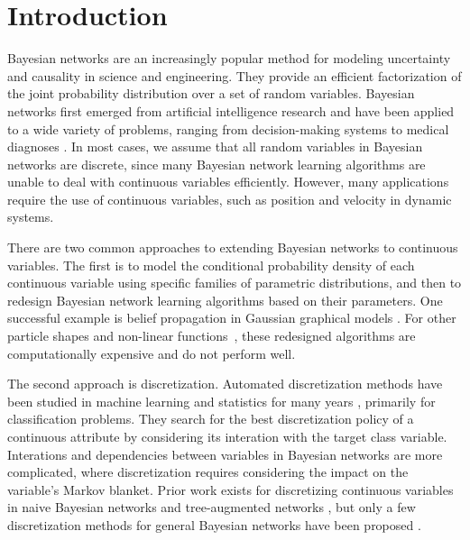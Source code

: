 \section{Introduction}
\label{intro}
Bayesian networks \citep{Pearl_1988, PGM_2009} are an increasingly popular method for modeling uncertainty and causality in science and engineering. They provide an efficient factorization of the joint probability distribution over a set of random variables. Bayesian networks first emerged from artificial intelligence research and have been applied to a wide variety of problems, ranging from decision-making systems \citep{DMU_2015} to medical diagnoses \citep{Lustgarten_2011}. In most cases, we assume that all random variables in Bayesian networks are discrete, since many Bayesian network learning algorithms are unable to deal with continuous variables efficiently. However, many applications
require the use of continuous variables, such as position and velocity in dynamic systems.

There are two common approaches to extending Bayesian networks to continuous variables. The first is to model the conditional probability density of each continuous variable using specific families of parametric distributions, and then to redesign Bayesian network learning algorithms based on their parameters. One successful example is belief propagation in Gaussian graphical models \citep{Weiss_2011}. For other particle shapes \citep{Ihler_2009} and non-linear functions~\todo{[cite]}, these redesigned algorithms are computationally expensive and do not perform well.

The second approach is discretization.
Automated discretization methods have been studied in machine learning and statistics for many years \citep{Dougherty_1995, Kerber_1992, Holte_1993, Fayyad_1993}, primarily for classification problems.
They search for the best discretization policy of a continuous attribute by considering its interation with the target class variable.
Interations and dependencies between variables in Bayesian networks are more complicated, where discretization requires considering the impact on the variable's Markov blanket.
Prior work exists for discretizing continuous variables in naive Bayesian networks and tree-augmented networks \citep{Fried_naive}, but only a few discretization methods for general Bayesian networks have been proposed \citep{Friedman_1996, Kozlov_1997, Monti_1998, Steck_2007}.


